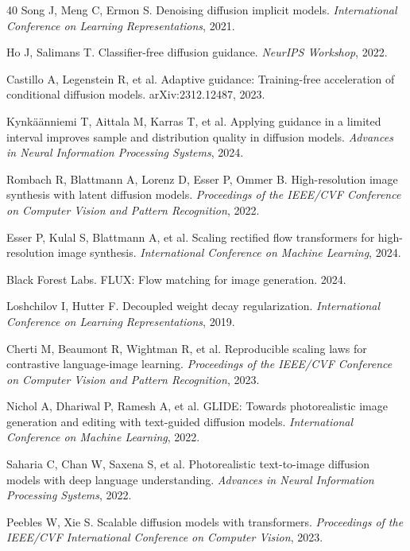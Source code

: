 \documentclass[times,twocolumn,final]{elsarticle}
\begin{document}
\begin{thebibliography}{40}
Song J, Meng C, Ermon S. Denoising diffusion implicit models. \textit{International Conference on Learning Representations}, 2021.

Ho J, Salimans T. Classifier-free diffusion guidance. \textit{NeurIPS Workshop}, 2022.

Castillo A, Legenstein R, et al. Adaptive guidance: Training-free acceleration of conditional diffusion models. arXiv:2312.12487, 2023.

Kynk\"a\"anniemi T, Aittala M, Karras T, et al. Applying guidance in a limited interval improves sample and distribution quality in diffusion models. \textit{Advances in Neural Information Processing Systems}, 2024.

Rombach R, Blattmann A, Lorenz D, Esser P, Ommer B. High-resolution image synthesis with latent diffusion models. \textit{Proceedings of the IEEE/CVF Conference on Computer Vision and Pattern Recognition}, 2022.

Esser P, Kulal S, Blattmann A, et al. Scaling rectified flow transformers for high-resolution image synthesis. \textit{International Conference on Machine Learning}, 2024.

Black Forest Labs. FLUX: Flow matching for image generation. 2024.

Loshchilov I, Hutter F. Decoupled weight decay regularization. \textit{International Conference on Learning Representations}, 2019.

Cherti M, Beaumont R, Wightman R, et al. Reproducible scaling laws for contrastive language-image learning. \textit{Proceedings of the IEEE/CVF Conference on Computer Vision and Pattern Recognition}, 2023.

Nichol A, Dhariwal P, Ramesh A, et al. GLIDE: Towards photorealistic image generation and editing with text-guided diffusion models. \textit{International Conference on Machine Learning}, 2022.

Saharia C, Chan W, Saxena S, et al. Photorealistic text-to-image diffusion models with deep language understanding. \textit{Advances in Neural Information Processing Systems}, 2022.

Peebles W, Xie S. Scalable diffusion models with transformers. \textit{Proceedings of the IEEE/CVF International Conference on Computer Vision}, 2023.


\end{thebibliography}
\end{document}
